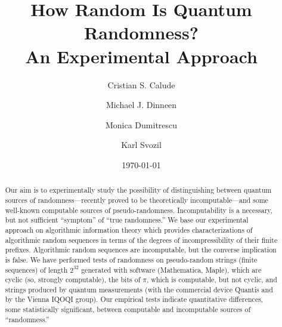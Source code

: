 \documentclass[%
 preprint,
 showpacs,
 showkeys,
 preprintnumbers,
 amsmath,amssymb,
 aps,
 prl,
  longbibliography,
 ]{revtex4-1}
\begin{document}
\title{How Random Is Quantum Randomness? \\ An Experimental Approach}

\author{Cristian S. Calude}

\author{Michael J. Dinneen}


\author{Monica Dumitrescu}


\author{Karl Svozil}


\date{\today}

\begin{abstract}
Our aim is to experimentally study the possibility of distinguishing between quantum sources of randomness---recently proved to be theoretically incomputable---and  some well-known computable sources of  pseudo-randomness. Incomputability is a necessary, but not sufficient ``symptom'' of ``true randomness.'' We base our experimental approach on algorithmic information theory which provides characterizations of algorithmic random sequences in terms of the degrees of incompressibility of their finite prefixes. Algorithmic random sequences are incomputable, but the converse implication is false. We have performed tests of randomness on pseudo-random strings (finite sequences) of length $2^{32}$ generated with software (Mathematica, Maple), which are cyclic (so, strongly computable), the bits of $\pi$, which is computable, but not cyclic, and strings produced by quantum measurements  (with the commercial device Quantis and  by the Vienna IQOQI group). Our empirical tests indicate quantitative differences, some statistically significant,  between computable and incomputable sources of ``randomness.''
\end{abstract}

\maketitle
\end{document}
